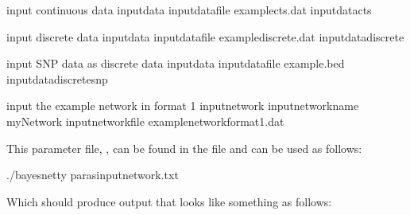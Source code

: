 \documentclass[letterpaper,10pt,english]{sphinxmanual}
\begin{document}
\begin{sphinxVerbatim}[commandchars=\\\{\}]
\PYGZsh{}input continuous data
\PYGZhy{}input\PYGZhy{}data
\PYGZhy{}input\PYGZhy{}data\PYGZhy{}file example\PYGZhy{}cts.dat
\PYGZhy{}input\PYGZhy{}data\PYGZhy{}cts

\PYGZsh{}input discrete data
\PYGZhy{}input\PYGZhy{}data
\PYGZhy{}input\PYGZhy{}data\PYGZhy{}file example\PYGZhy{}discrete.dat
\PYGZhy{}input\PYGZhy{}data\PYGZhy{}discrete

\PYGZsh{}input SNP data as discrete data
\PYGZhy{}input\PYGZhy{}data
\PYGZhy{}input\PYGZhy{}data\PYGZhy{}file example.bed
\PYGZhy{}input\PYGZhy{}data\PYGZhy{}discrete\PYGZhy{}snp

\PYGZsh{}input the example network in format 1
\PYGZhy{}input\PYGZhy{}network
\PYGZhy{}input\PYGZhy{}network\PYGZhy{}name myNetwork
\PYGZhy{}input\PYGZhy{}network\PYGZhy{}file example\PYGZhy{}network\PYGZhy{}format1.dat
\end{sphinxVerbatim}

\sphinxAtStartPar
This parameter file, , can be found in the file  and can be used as follows:

\begin{sphinxVerbatim}[commandchars=\\\{\}]
./bayesnetty paras\PYGZhy{}input\PYGZhy{}network.txt
\end{sphinxVerbatim}

\sphinxAtStartPar
Which should produce output that looks like something as follows:
\end{document}
